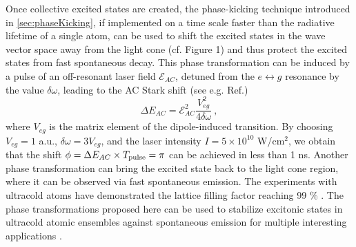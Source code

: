 Once collective excited states are created, the phase-kicking technique introduced in  \autoref{sec:phaseKicking}, 
if implemented on a time scale faster than the radiative lifetime of a single atom, 
can be used to shift the excited states in the wave vector space
away from the light cone (cf. Figure 1) and thus protect the excited states from fast spontaneous decay. This phase transformation can be induced by a pulse of an off-resonant laser field $\mathcal{E}_{AC}$,
detuned from the  $e \leftrightarrow g$ resonance by the value  $\delta\omega$, leading to the
AC Stark shift {(see e.g. Ref.\cite{focusing-books-1})}
\begin{equation}
\Delta E_{AC} =  \mathcal{E}_{AC}^2 \frac{V_{eg}^2}{4 \delta \omega} \ ,
\end{equation}
where $V_{eg}$ is the matrix element of the dipole-induced transition.   By choosing $ V_{eg}= 1$ a.u.,
$\delta \omega = 3 V_{eg}$, and the laser intensity $I = 5\times10^{10}$ W/cm$^2$, we obtain that the shift
 $\phi = \Delta E_{AC} \times T_{\rm pulse} = \pi $ can be achieved in less than 1 ns. 
Another phase transformation can bring the excited state back to the light cone region, where it can be observed via fast spontaneous emission. 
 The experiments with ultracold atoms have demonstrated  the lattice filling factor reaching 99 \%  \cite{atom-mott1, atom-mott2, atom-mott3}.
 The phase transformations proposed here can be used to stabilize excitonic states in ultracold atomic ensembles against spontaneous emission  
for multiple interesting applications \cite{Zoubi1, Zoubi-review}. 


